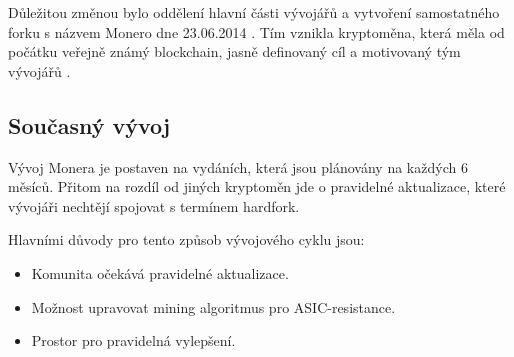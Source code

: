 \documentclass[
  printed, %
  table,   %
  nolof,     %
  nolot,     %
           oneside, color
]{fithesis3}
\begin{document}
Důležitou změnou bylo oddělení hlavní části vývojářů a vytvoření samostatného forku s názvem Monero dne 23.06.2014 . Tím vznikla kryptoměna, která měla od počátku veřejně známý blockchain, jasně definovaný cíl a motivovaný tým vývojářů \cite{monerofork}.



\subsection{Současný vývoj}
Vývoj Monera je postaven na vydáních, která jsou plánovány na každých 6 měsíců. Přitom na rozdíl od jiných kryptoměn jde o pravidelné aktualizace, které vývojáři nechtějí spojovat s termínem hardfork.

Hlavními důvody pro tento způsob vývojového cyklu jsou:
\begin{itemize}\itemsep0em
\item Komunita očekává pravidelné aktualizace.
\item Možnost upravovat mining algoritmus pro ASIC-resistance.
\item Prostor pro pravidelná vylepšení.
\end{itemize}
\end{document}
